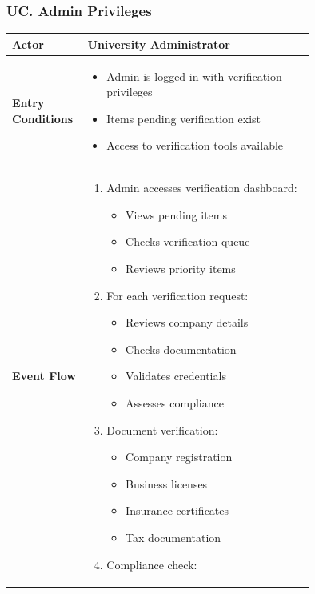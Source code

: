 \subsubsection*{UC\cuc . Admin Privileges}
\begin{longtable}{|l|p{0.75\linewidth}|}
    \hline
    \textbf{Actor}            & University Administrator \\
    \hline
    \textbf{Entry Conditions} & 
    \begin{itemize}
        \item Admin is logged in with verification privileges
        \item Items pending verification exist
        \item Access to verification tools available
    \end{itemize} \\
    \hline
    \textbf{Event Flow}       & 
    \begin{enumerate}
        \item Admin accesses verification dashboard:
        \begin{itemize}
            \item Views pending items
            \item Checks verification queue
            \item Reviews priority items
        \end{itemize}
        \item For each verification request:
        \begin{itemize}
            \item Reviews company details
            \item Checks documentation
            \item Validates credentials
            \item Assesses compliance
        \end{itemize}
        \item Document verification:
        \begin{itemize}
            \item Company registration
            \item Business licenses
            \item Insurance certificates
            \item Tax documentation
        \end{itemize}
        \item Compliance check:
        \begin{itemize}

\end{itemize}
\end{enumerate}
\end{longtable}
